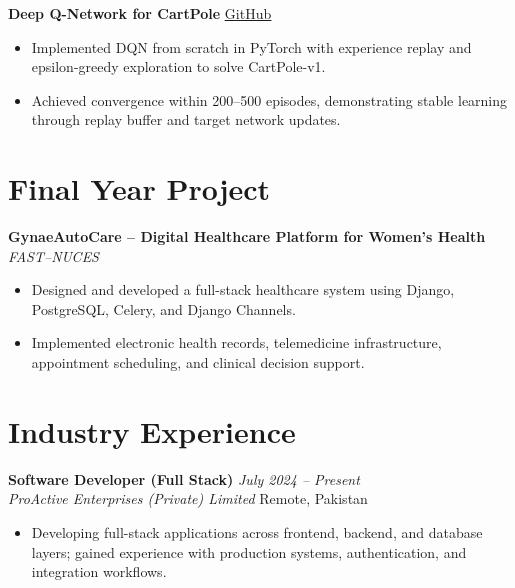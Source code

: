 \documentclass[10.5pt,a4paper]{article}
\newcommand{\entry}[4]{%
    \noindent
    \noindent\textbf{#1} \hfill \textit{#2}\\
    \textit{#3} \hfill #4\\[-1pt]
}
\begin{document}
\vspace{4pt}

\noindent\textbf{Deep Q-Network for CartPole}
\hfill
\href{https://github.com/SaadARazzaq/dqn-cartpole-pytorch}{\underline{GitHub}}
\begin{itemize}
    \item Implemented DQN from scratch in PyTorch with experience replay and epsilon-greedy exploration to solve CartPole-v1.
    \item Achieved convergence within 200--500 episodes, demonstrating stable learning through replay buffer and target network updates.
\end{itemize}


\section*{Final Year Project}

\noindent\textbf{GynaeAutoCare -- Digital Healthcare Platform for Women's Health}
\hfill
\textit{FAST--NUCES}
\begin{itemize}
    \item Designed and developed a full-stack healthcare system using Django, PostgreSQL, Celery, and Django Channels.
    \item Implemented electronic health records, telemedicine infrastructure, appointment scheduling, and clinical decision support.
\end{itemize}


\section*{Industry Experience}

\entry
{Software Developer (Full Stack)}
{July 2024 -- Present}
{ProActive Enterprises (Private) Limited}
{Remote, Pakistan}

\begin{itemize}
    \item Developing full-stack applications across frontend, backend, and database layers; gained experience with production systems, authentication, and integration workflows.
\end{itemize}

\vspace{3pt}
\end{document}
